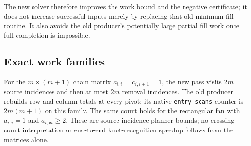 The new solver therefore improves the work bound and the negative certificate;
it does not increase successful inputs merely by replacing that old
minimum-fill routine.  It also avoids the old producer's potentially large
partial fill work once full completion is impossible.

\subsection{Exact work families}

For the $m\times(m+1)$ chain matrix $a_{i,i}=a_{i,i+1}=1$, the new pass
visits $2m$ source incidences and then at most $2m$ removal incidences.
The old producer rebuilds row and column totals at every pivot; its native
\texttt{entry\_scans} counter is $2m(m+1)$ on this family.  The same count
holds for the rectangular fan with $a_{i,i}=1$ and $a_{i,m}\ge2$.
These are source-incidence planner bounds; no crossing-count interpretation
or end-to-end knot-recognition speedup follows from the matrices alone.
